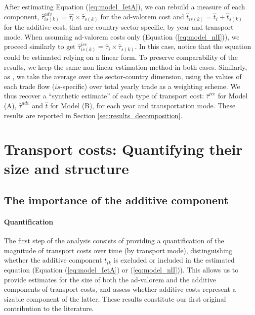 \documentclass[a4paper,11pt]{article}
\begin{document}
After estimating Equation (\ref{eq:model_IetA}), we can rebuild a measure of each component, $\widehat{\tau}^{adv}_{is(k)} = \widehat{\tau_{i}} \times \widehat{\tau}_{s(k)}$ for the ad-valorem cost and $\widehat{t}_{is(k)} = \widehat{t}_{i} + \widehat{t}_{s(k)}$ for the additive cost, that are country-sector specific, by year and transport mode.
When assuming ad-valorem costs only (Equation (\ref{eq:model_nlI})), we proceed similarly to get $\widehat{\tau}^{ice}_{is(k)} = \widehat{\tau}_{i} \times \widehat{\tau}_{s(k)}$.
In this case, notice that the equation could be estimated relying on a linear form.
To preserve comparability of the results, we keep the same non-linear estimation method in both cases.
Similarly, as \cite{Irrazabal_2015}, we take the average over the sector-country dimension, using the values of each trade flow ($is$-specific) over total yearly trade as a weighting scheme.
We thus recover a ``synthetic estimate'' of each type of transport cost: $\widehat{\tau}^{ice}$ for Model (A), $\widehat{\tau}^{adv}$ and $\widehat{t}$ for Model (B), for each year and transportation mode.
These results are reported in Section \ref{sec:results_decomposition}.


\section{Transport costs: Quantifying their size and structure}\label{sec:basic_results}

\subsection{The importance of the additive component \label{sec:results_decomposition}}

\paragraph{Quantification} The first step of the analysis consists of providing a quantification of the magnitude of transport costs over time (by transport mode), distinguishing whether the additive component $t_{ik}$ is excluded or included in the estimated equation (Equation (\ref{eq:model_IetA}) or (\ref{eq:model_nlI})).
This allows us to provide estimates for the size of both the ad-valorem and the additive components of transport costs, and assess whether additive costs represent a sizable component of the latter.
These results constitute our first original contribution to the literature.
\smallskip
\end{document}
